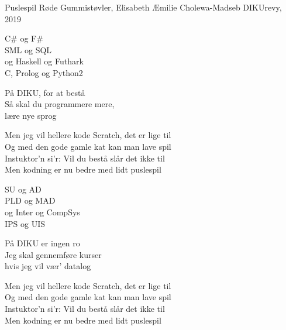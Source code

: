 \begin{song}{Puslespil}
    {} %
    {Røde Gummistøvler, Elisabeth} %
    {Æmilie Cholewa-Madseb} %
    {DIKUrevy, 2019} %
    {\NotCCLIed} %
  
    \begin{SBVerse}
      C\# og F\#  \\
      SML og SQL \\
      og Haskell og Futhark \\
      C, Prolog og Python2 \\ \medskip
      
      På DIKU, for at bestå  \\
      Så skal du programmere mere, \\
      lære nye sprog \\
    \end{SBVerse}

    \begin{SBChorus}
      Men jeg vil hellere kode Scratch, det er lige til \\
      Og med den gode gamle kat kan man lave spil \\
      Instuktor'n si'r: Vil du bestå slår det ikke til \\
      Men kodning er nu bedre med lidt puslespil \\
    \end{SBChorus}

    \begin{SBVerse}
        SU og AD \\
        PLD og MAD \\
        og Inter og CompSys \\
        IPS og UIS \\ \medskip
        
        På DIKU er ingen ro \\
        Jeg skal gennemføre kurser \\
        hvis jeg vil vær' datalog \\
    \end{SBVerse}

    \begin{SBChorus}
        Men jeg vil hellere kode Scratch, det er lige til \\
        Og med den gode gamle kat kan man lave spil \\
        Instuktor'n si'r: Vil du bestå slår det ikke til \\
        Men kodning er nu bedre med lidt puslespil \\
    \end{SBChorus}


\end{song}
